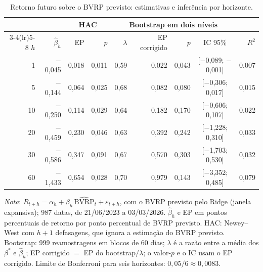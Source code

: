 \begin{table}[H]
\centering
\footnotesize
\caption{Retorno futuro sobre o BVRP previsto: estimativas e inferência por horizonte.}
\label{tab:retlin-principal}
\begin{tabular}{rrrrrrrcr}
\toprule
 & & \multicolumn{2}{c}{HAC} & \multicolumn{4}{c}{Bootstrap em dois níveis} & \\ \cmidrule(lr){3-4}\cmidrule(lr){5-8}
$h$ & $\hat\beta_h$ & EP & $p$ & $\lambda$ & EP corrigido & $p$ & IC 95\% & $R^2$ \\
\midrule
1 & $-$0{,}045 & 0{,}018 & 0{,}011 & 0{,}59 & 0{,}022 & 0{,}043 & [$-$0{,}089; $-$0{,}001] & 0{,}007 \\
5 & $-$0{,}144 & 0{,}064 & 0{,}025 & 0{,}68 & 0{,}082 & 0{,}080 & [$-$0{,}306; 0{,}017] & 0{,}015 \\
10 & $-$0{,}250 & 0{,}114 & 0{,}029 & 0{,}64 & 0{,}182 & 0{,}170 & [$-$0{,}606; 0{,}107] & 0{,}022 \\
20 & $-$0{,}459 & 0{,}230 & 0{,}046 & 0{,}63 & 0{,}392 & 0{,}242 & [$-$1{,}228; 0{,}310] & 0{,}033 \\
30 & $-$0{,}586 & 0{,}347 & 0{,}091 & 0{,}67 & 0{,}570 & 0{,}303 & [$-$1{,}703; 0{,}530] & 0{,}032 \\
60 & $-$1{,}433 & 0{,}654 & 0{,}028 & 0{,}70 & 0{,}979 & 0{,}143 & [$-$3{,}352; 0{,}485] & 0{,}079 \\
\bottomrule
\end{tabular}
\par\smallskip
\parbox{0.95\linewidth}{\footnotesize\textit{Nota}: $R_{t+h} = \alpha_h + \beta_h\,\widehat{\text{BVRP}}_t + \varepsilon_{t+h}$, com o BVRP previsto pelo Ridge (janela expansiva); 987 datas, de 21/06/2023 a 03/03/2026. $\hat\beta_h$ e EP em pontos percentuais de retorno por ponto percentual de BVRP previsto. HAC: Newey--West com $h+1$ defasagens, que ignora a estimação do BVRP previsto. Bootstrap: 999 reamostragens em blocos de 60 dias; $\lambda$ é a razão entre a média dos $\beta^*$ e $\hat\beta_h$; EP corrigido $=$ EP do bootstrap$/\lambda$; o valor-$p$ e o IC usam o EP corrigido. Limite de Bonferroni para seis horizontes: $0{,}05/6 \approx 0{,}0083$.}
\end{table}
